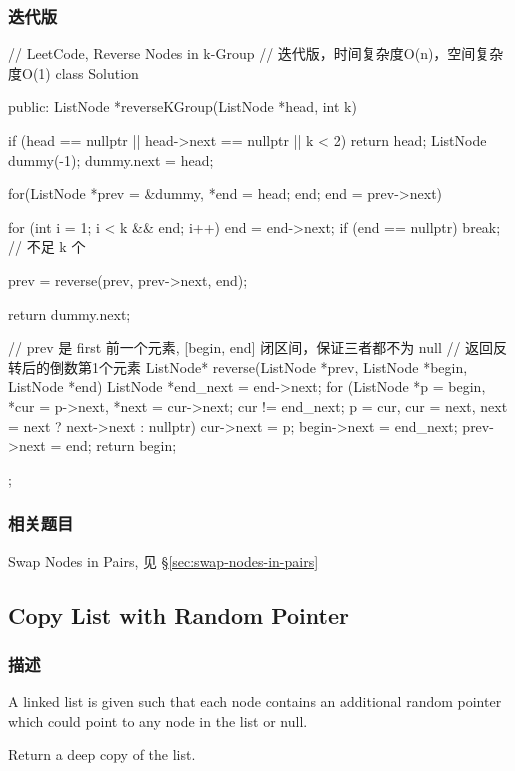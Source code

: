 \subsubsection{迭代版}
\begin{Code}
// LeetCode, Reverse Nodes in k-Group
// 迭代版，时间复杂度O(n)，空间复杂度O(1)
class Solution {
public:
    ListNode *reverseKGroup(ListNode *head, int k) {
        if (head == nullptr || head->next == nullptr || k < 2) return head;
        ListNode dummy(-1);
        dummy.next = head;

        for(ListNode *prev = &dummy, *end = head; end; end = prev->next) {
            for (int i = 1; i < k && end; i++)
                end = end->next;
            if (end  == nullptr) break;  // 不足 k 个

            prev = reverse(prev, prev->next, end);
        }

        return dummy.next;
    }

    // prev 是 first 前一个元素, [begin, end] 闭区间，保证三者都不为 null
    // 返回反转后的倒数第1个元素
    ListNode* reverse(ListNode *prev, ListNode *begin, ListNode *end) {
        ListNode *end_next = end->next;
        for (ListNode *p = begin, *cur = p->next, *next = cur->next;
                cur != end_next;
                p = cur, cur = next, next = next ? next->next : nullptr) {
            cur->next = p;
        }
        begin->next = end_next;
        prev->next = end;
        return begin;
    }
};
\end{Code}


\subsubsection{相关题目}
\begindot
\item Swap Nodes in Pairs, 见 \S \ref{sec:swap-nodes-in-pairs}
\myenddot


\subsection{Copy List with Random Pointer}
\label{sec:copy-list-with-random-pointer}


\subsubsection{描述}
A linked list is given such that each node contains an additional random pointer which could point to any node in the list or null.

Return a deep copy of the list.


